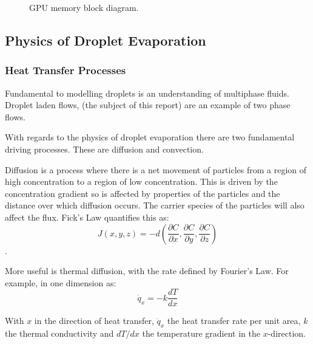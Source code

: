 \documentclass[../Interim_Report_Master]{subfiles}
\begin{document}
\begin{figure}
\centering
{}
\caption{GPU memory block diagram.}
\label{GPU}
\end{figure}

\newpage

\subsection{Physics of Droplet Evaporation}
\subsubsection{Heat Transfer Processes}
Fundamental to modelling droplets is an understanding of multiphase fluids. Droplet laden flows, (the subject of this report) are an example of two phase flows.

With regards to the physics of droplet evaporation there are two fundamental driving processes. These are diffusion and convection.

Diffusion is a process where there is a net movement of particles from a region of high concentration to a region of low concentration. This is driven by the concentration gradient so is affected by properties of the particles and the distance over which diffusion occurs. The carrier species of the particles will also affect the flux. Fick's Law quantifies this as:
\begin{equation}
J(x,y,z) = -d\left(\frac{\partial C}{\partial x},\frac{\partial C}{\partial y},\frac{\partial C}{\partial z}\right)
\end{equation}
\cite{Nazaroff2001}.

More useful is thermal diffusion, with the rate defined by Fourier's Law. For example, in one dimension as:
\begin{equation}
\dot{q}_x=-k\frac{dT}{dx}
\end{equation}

With $x$ in the direction of heat transfer, $\dot{q}_x$ the heat transfer rate per unit area, $k$ the thermal conductivity and $dT/dx$ the temperature gradient in the $x$-direction. \cite{Deiterding2019}
\end{document}
